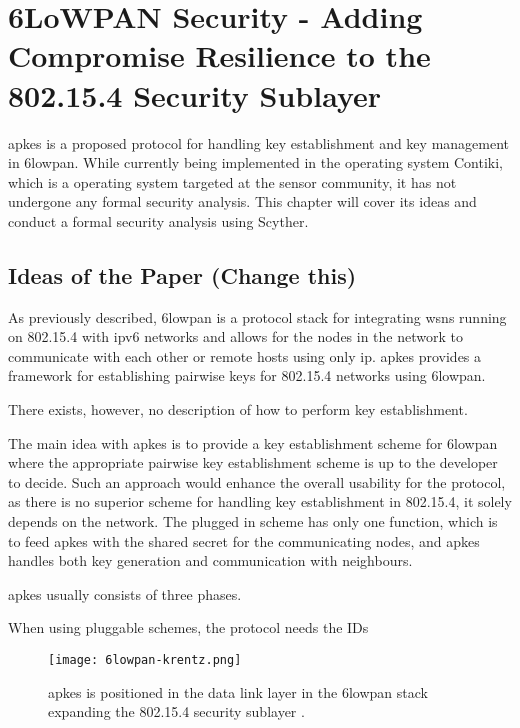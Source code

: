 \chapter{6LoWPAN Security - Adding Compromise Resilience to the 802.15.4 Security Sublayer}
\label{chp:krentz-6lowpan}


\gls{apkes} is a proposed protocol for handling key establishment and key management in \gls{6lowpan}. While currently being implemented in the operating system Contiki, which is a operating system targeted at the sensor community, it has not undergone any formal security analysis. This chapter will cover its ideas and conduct a formal security analysis using Scyther. 


\section{Ideas of the Paper (Change this)}

As previously described, \gls{6lowpan} is a protocol stack for integrating \gls{wsn}s running on 802.15.4 with \gls{ip}v6 networks and allows for the nodes in the network to communicate with each other or remote hosts using only \gls{ip}. \gls{apkes} provides a framework for establishing pairwise keys for 802.15.4 networks using \gls{6lowpan}. 


There exists, however, no description of how to perform key establishment.


The main idea with \gls{apkes} is to provide a key establishment scheme for \gls{6lowpan} where the appropriate pairwise key establishment scheme is up to the developer to decide. Such an approach would enhance the overall usability for the protocol, as there is no superior scheme for handling key establishment in 802.15.4, it solely depends on the network. The plugged in scheme has only one function, which is to feed \gls{apkes} with the shared secret for the communicating nodes, and \gls{apkes} handles both key generation and communication with neighbours. 

\gls{apkes} usually consists of three phases.


When using pluggable schemes, the protocol needs the IDs 




\begin{figure}[h]
	\centering
	\texttt{[image: 6lowpan-krentz.png]}
	\caption{\gls{apkes} is positioned in the data link layer in the \gls{6lowpan} stack expanding the 802.15.4 security sublayer \cite{krentz20136lowpan}.}
	\label{fig:6lowpan-krentz}
\end{figure}



